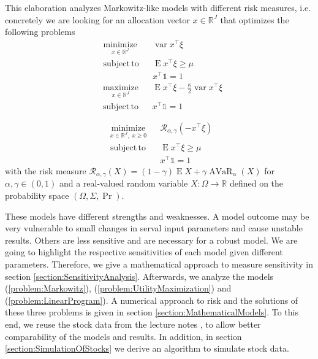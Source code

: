 \documentclass[a4paper, english, 11pt, onecolumn, oneside, final]{article}
\numberwithin{equation}{section}   %
\DeclareMathOperator{\var}{\mathrm{var}}    %
\DeclareMathOperator{\pr}{\mathrm{Pr}}     %
\DeclareMathOperator{\E}{\mathrm{E}}	    %
\DeclareMathOperator{\AVaR}{\mathrm{AVaR}}	%
\newcommand{\R}{\mathbb{R}}                 %
\newcommand{\one}{\mathds 1}
\theoremstyle{plain}
\theoremstyle{definition}
\theoremstyle{remark}
\begin{document}
This elaboration analyzes Markowitz-like models with different risk measures, i.e. concretely we are looking for an allocation vector $x\in\R^J$ that optimizes the following problems
\begin{equation}
    \label{problem:Markowitz}
    \begin{aligned}
        & \underset{x\in\R^J}{\mathrm{minimize}} & & \var x^\top\xi \\
        & \mathrm{subject\,to} & & \E x^\top\xi \geq \mu\;\;\;\;\;\;\;\;\;\;\;\; \\
        & & & x^\top\one = 1
    \end{aligned}
\end{equation}
\begin{equation}
    \label{problem:UtilityMaximization}
    \begin{aligned}
        & \underset{x\in\R^J}{\mathrm{maximize}} & & \E x^\top\xi - \frac{\kappa}{2}\var x^\top\xi \\
        & \mathrm{subject\,to} & & x^\top\one = 1\\\\
    \end{aligned}
\end{equation}
\begin{equation}
    \label{problem:LinearProgram}
    \begin{aligned}
        & \underset{x\in\R^J,\;x\geq 0}{\mathrm{minimize}} & & \mathcal{R}_{\alpha,\gamma}(-x^\top\xi)\; \\
        & \mathrm{subject\,to} & & \E x^\top\xi \geq \mu \\
        & & & x^\top\one = 1
    \end{aligned}
\end{equation}
with the risk measure $\mathcal{R}_{\alpha,\gamma}(X) = (1-\gamma)\E X + \gamma\AVaR_\alpha(X)$ for $\alpha,\gamma\in(0,1)$ and a real-valued random variable $X\colon\Omega\to\R$ defined on the probability space $(\Omega, \Sigma, \pr)$. \medskip

These models have different strengths and weaknesses. A model outcome may be very vulnerable to small changes in serval input parameters and cause unstable results. Others are less sensitive and are necessary for a robust model. We are going to highlight the respective sensitivities of each model given different parameters. Therefore, we give a mathematical approach to measure sensitivity in section \ref{section:SensitivityAnalysis}. Afterwards, we analyze the models (\ref{problem:Markowitz}), (\ref{problem:UtilityMaximization}) and (\ref{problem:LinearProgram}). A numerical approach to risk and the solutions of these three problems is given in section \ref{section:MathematicalModels}. To this end, we reuse the stock data from the lecture notes \cite{PichlerPortfoliooptimierung}, to allow better comparability of the models and results. In addition, in section \ref{section:SimulationOfStocks} we derive an algorithm to simulate stock data.
\end{document}
